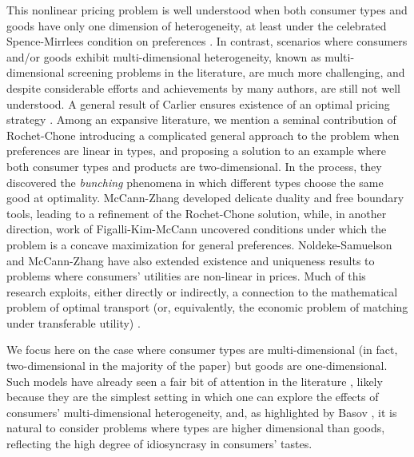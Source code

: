 \documentclass[12pt,reqno]{amsart}
\begin{document}
This nonlinear pricing problem is well understood when both consumer types and goods have only one dimension of heterogeneity, at least under the celebrated Spence-Mirrlees condition on preferences \cite{mirrlees, MaskinRiley84, MUSSARosen78}.  In contrast, scenarios where consumers and/or goods exhibit multi-dimensional heterogeneity, known as multi-dimensional screening problems in the literature, are much more challenging, and despite considerable efforts and achievements by many authors, are still not well understood.  A general result of Carlier ensures existence of an optimal pricing strategy \cite{CARLIER2001}.  Among an expansive literature, we mention a seminal contribution of Rochet-Chone \cite{RochetChone98} introducing a complicated general approach to the problem when preferences are linear in types, and proposing a solution to an example where both consumer types and products are two-dimensional.  In the process, they discovered the \emph{bunching} phenomena in which different types choose the same good at optimality.  McCann-Zhang \cite{McCannZhang24} developed delicate duality and free boundary tools, leading to a refinement of the Rochet-Chone solution, while, in another direction, work of Figalli-Kim-McCann \cite{FigalliKimMcCann11} uncovered conditions under which the problem is a concave maximization for general preferences. Noldeke-Samuelson \cite{NoldekeSamuelson18} and McCann-Zhang \cite{McCannZhang19} have also extended existence and uniqueness results to problems where consumers' utilities are non-linear in prices. %
Much of this research exploits, either directly or indirectly, a connection to the mathematical problem of optimal transport (or, equivalently, the economic problem of matching under transferable utility) \cite{Santambrogio, Galichon16}. 



We focus here on the case where consumer types are multi-dimensional (in fact, two-dimensional in the majority of the paper) but goods are one-dimensional.  Such models have already seen a fair bit of attention in the literature \cite{Deneckere, laffont, basov-2003}, likely because they are the simplest setting in which one can explore the effects of consumers' multi-dimensional heterogeneity, and, as highlighted by Basov \cite{basov-book}, it is natural to consider problems where types are higher dimensional than goods, reflecting the high degree of idiosyncrasy in consumers' tastes.
\end{document}
